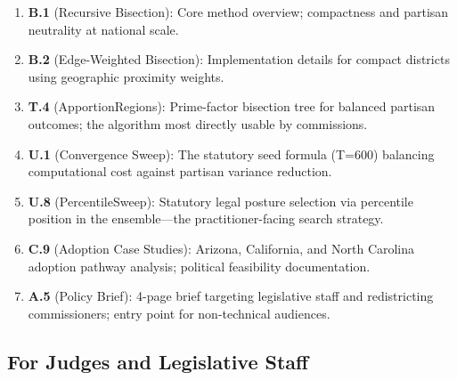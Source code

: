 \documentclass[12pt]{article}
\begin{document}
\begin{enumerate}[leftmargin=*,noitemsep,topsep=2pt]
    \item \textbf{B.1} (Recursive Bisection): Core method overview;
        compactness and partisan neutrality at national scale.

    \item \textbf{B.2} (Edge-Weighted Bisection): Implementation details for
        compact districts using geographic proximity weights.

    \item \textbf{T.4} (ApportionRegions): Prime-factor bisection tree for
        balanced partisan outcomes; the algorithm most directly usable by
        commissions.

    \item \textbf{U.1} (Convergence Sweep): The statutory seed formula
        (T=600) balancing computational cost against partisan variance
        reduction.

    \item \textbf{U.8} (PercentileSweep): Statutory legal posture selection
        via percentile position in the ensemble---the practitioner-facing
        search strategy.

    \item \textbf{C.9} (Adoption Case Studies): Arizona, California, and
        North Carolina adoption pathway analysis; political feasibility
        documentation.

    \item \textbf{A.5} (Policy Brief): 4-page brief targeting legislative
        staff and redistricting commissioners; entry point for non-technical
        audiences.
\end{enumerate}

\subsection{For Judges and Legislative Staff}
\end{document}
